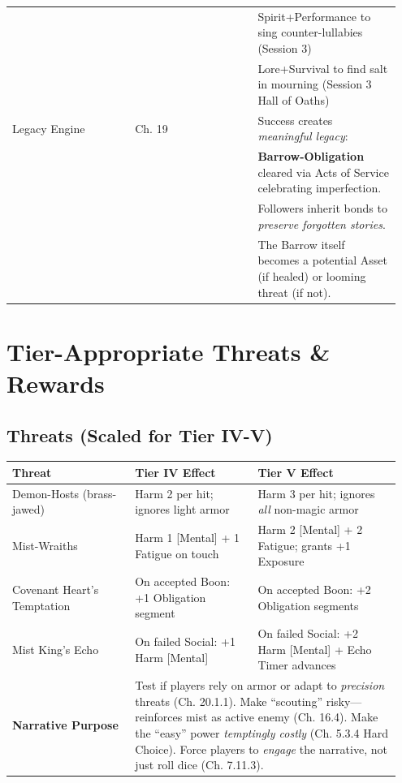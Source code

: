 \documentclass[12pt]{article}
\begin{document}
\begin{tabular}{|p{0.3\linewidth}|p{0.3\linewidth}|p{0.35\linewidth}|}
 & & Spirit+Performance to sing counter-lullabies (Session 3) \\
 & & Lore+Survival to find salt in mourning (Session 3 Hall of Oaths) \\
\hline
Legacy Engine & Ch. 19 & Success creates \textit{meaningful legacy}: \\
 & & \textbf{Barrow-Obligation} cleared via Acts of Service celebrating imperfection. \\
 & & Followers inherit bonds to \textit{preserve forgotten stories}. \\
 & & The Barrow itself becomes a potential Asset (if healed) or looming threat (if not). \\
\hline
\end{tabular}

\section{Tier-Appropriate Threats \& Rewards}
\subsection{Threats (Scaled for Tier IV-V)}
\begin{tabular}{|p{0.3\linewidth}|p{0.3\linewidth}|p{0.35\linewidth}|}
\hline
\textbf{Threat} & \textbf{Tier IV Effect} & \textbf{Tier V Effect} \\
\hline
Demon-Hosts (brass-jawed) & Harm 2 per hit; ignores light armor & Harm 3 per hit; ignores \textit{all} non-magic armor \\
\hline
Mist-Wraiths & Harm 1 [Mental] + 1 Fatigue on touch & Harm 2 [Mental] + 2 Fatigue; grants +1 Exposure \\
\hline
Covenant Heart's Temptation & On accepted Boon: +1 Obligation segment & On accepted Boon: +2 Obligation segments \\
\hline
Mist King's Echo & On failed Social: +1 Harm [Mental] & On failed Social: +2 Harm [Mental] + Echo Timer advances \\
\hline
\textbf{Narrative Purpose} & \multicolumn{2}{p{0.65\linewidth}|}{Test if players rely on armor or adapt to \textit{precision} threats (Ch. 20.1.1). Make ``scouting'' risky---reinforces mist as active enemy (Ch. 16.4). Make the ``easy'' power \textit{temptingly costly} (Ch. 5.3.4 Hard Choice). Force players to \textit{engage} the narrative, not just roll dice (Ch. 7.11.3).} \\
\hline
\end{tabular}
\end{document}
